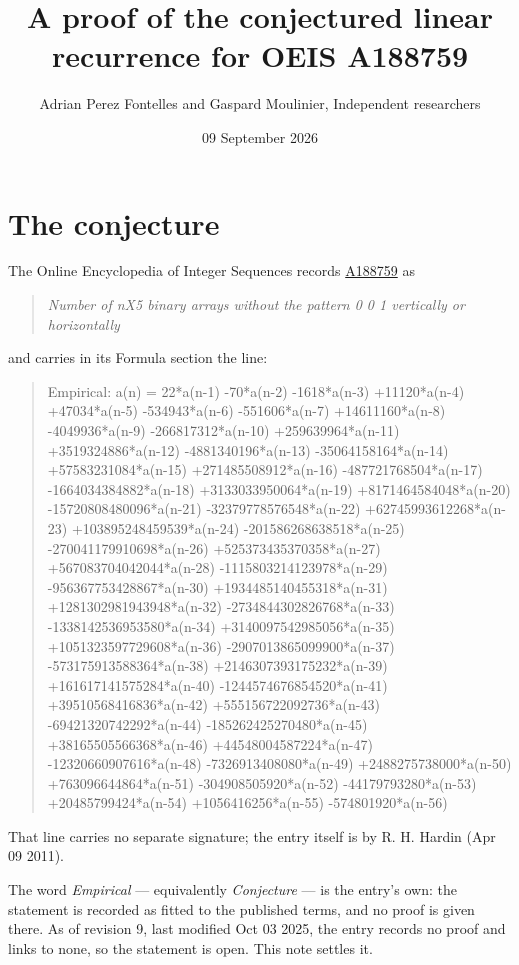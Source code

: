 \documentclass[11pt]{article}
\title{A proof of the conjectured linear recurrence for OEIS A188759}
\author{Adrian Perez Fontelles and Gaspard Moulinier, Independent researchers}
\date{09 September 2026}
\theoremstyle{definition}
\begin{document}
\maketitle
\section{The conjecture}

The Online Encyclopedia of Integer Sequences records \href{https://oeis.org/A188759}{A188759} as

\begin{quote}\itshape Number of nX5 binary arrays without the pattern 0 0 1 vertically or horizontally\end{quote}

and carries in its Formula section the line:

\begin{quote}\ttfamily Empirical: a(n) = 22*a(n-1) -70*a(n-2) -1618*a(n-3) +11120*a(n-4) +47034*a(n-5) -534943*a(n-6) -551606*a(n-7) +14611160*a(n-8) -4049936*a(n-9) -266817312*a(n-10) +259639964*a(n-11) +3519324886*a(n-12) -4881340196*a(n-13) -35064158164*a(n-14) +57583231084*a(n-15) +271485508912*a(n-16) -487721768504*a(n-17) -1664034384882*a(n-18) +3133033950064*a(n-19) +8171464584048*a(n-20) -15720808480096*a(n-21) -32379778576548*a(n-22) +62745993612268*a(n-23) +103895248459539*a(n-24) -201586268638518*a(n-25) -270041179910698*a(n-26) +525373435370358*a(n-27) +567083704042044*a(n-28) -1115803214123978*a(n-29) -956367753428867*a(n-30) +1934485140455318*a(n-31) +1281302981943948*a(n-32) -2734844302826768*a(n-33) -1338142536953580*a(n-34) +3140097542985056*a(n-35) +1051323597729608*a(n-36) -2907013865099900*a(n-37) -573175913588364*a(n-38) +2146307393175232*a(n-39) +161617141575284*a(n-40) -1244574676854520*a(n-41) +39510568416836*a(n-42) +555156722092736*a(n-43) -69421320742292*a(n-44) -185262425270480*a(n-45) +38165505566368*a(n-46) +44548004587224*a(n-47) -12320660907616*a(n-48) -7326913408080*a(n-49) +2488275738000*a(n-50) +763096644864*a(n-51) -304908505920*a(n-52) -44179793280*a(n-53) +20485799424*a(n-54) +1056416256*a(n-55) -574801920*a(n-56)\end{quote}

That line carries no separate signature; the entry itself is by R. H. Hardin (Apr 09 2011).

The word {\itshape Empirical} --- equivalently {\itshape Conjecture} --- is the entry's own: the statement is recorded as fitted to the published terms, and no proof is given there. As of revision 9, last modified Oct 03 2025, the entry records no proof and links to none, so the statement is open. This note settles it.
\end{document}
